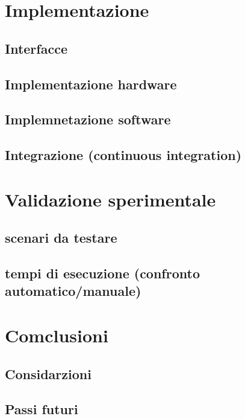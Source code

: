 \documentclass{article}
\begin{document}
\section{Implementazione}
\subsection{Interfacce}
\subsection{Implementazione hardware}
\subsection{Implemnetazione software}
\subsection{Integrazione (continuous integration)}

\section{Validazione sperimentale}
\subsection{scenari da testare}
\subsection{tempi di esecuzione (confronto automatico/manuale)}

\section{Comclusioni}
\subsection{Considarzioni}
\subsection{Passi futuri}
\end{document}
